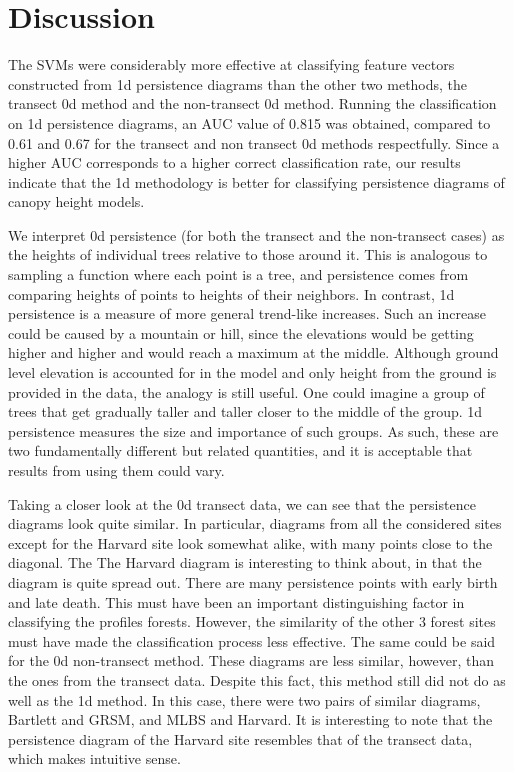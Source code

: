 \documentclass[10pt]{article}
\begin{document}
\section*{Discussion}
\indent The SVMs were considerably more effective at classifying feature vectors constructed from 1d persistence diagrams than the other two methods, the transect 0d method and the non-transect 0d method. Running the classification on 1d persistence diagrams, an AUC value of 0.815 was obtained, compared to 0.61 and 0.67 for the transect and non transect 0d methods respectfully. Since a higher AUC corresponds to a higher correct classification rate, our results indicate that the 1d methodology is better for classifying persistence diagrams of canopy height models. 

\indent We interpret 0d persistence (for both the transect and the non-transect cases) as the heights of individual trees relative to those around it. This is analogous to sampling a function where each point is a tree, and persistence comes from comparing heights of points to heights of their neighbors. In contrast, 1d persistence is a measure of more general trend-like increases. Such an increase could be caused by a mountain or hill, since the elevations would be getting higher and higher and would reach a maximum at the middle. Although ground level elevation is accounted for in the model and only height from the ground is provided in the data, the analogy is still useful. One could imagine a group of trees that get gradually taller and taller closer to the middle of the group. 1d persistence measures the size and importance of such groups. As such, these are two fundamentally different but related quantities, and it is acceptable that results from using them could vary.

\indent Taking a closer look at the 0d transect data, we can see that the persistence diagrams look quite similar. In particular, diagrams from all the considered sites except for the Harvard site look somewhat alike, with many points close to the diagonal. The The Harvard diagram is interesting to think about, in that the diagram is quite spread out. There are many persistence points with early birth and late death. This must have been an important distinguishing factor in classifying the profiles forests. However, the similarity of the other 3 forest sites must have made the classification process less effective. The same could be said for the 0d non-transect method. These diagrams are less similar, however, than the ones from the transect data. Despite this fact, this method still did not do as well as the 1d method. In this case, there were two pairs of similar diagrams, Bartlett and GRSM, and MLBS and Harvard. It is interesting to note that the persistence diagram of the Harvard site resembles that of the transect data, which makes intuitive sense.
\end{document}
